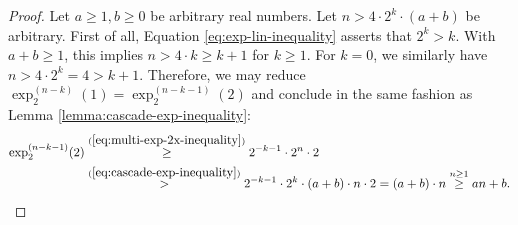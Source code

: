 \begin{proof}
	Let $a\geq 1,b\geq 0$ be arbitrary real numbers.
	Let $n>4\cdot 2^k \cdot (a+b)$ be arbitrary. 
	First of all, Equation \ref{eq:exp-lin-inequality} asserts that $2^k>k$.
	With $a+b\geq 1$, this implies $n>4\cdot k\geq k+1$ for $k\geq 1$.
	For $k=0$, we similarly have $n>4\cdot 2^k=4>k+1$.
	Therefore, we may reduce $\exp^{(n-k)}_2(1)=\exp^{(n-k-1)}_2(2)$ and conclude in the same fashion as Lemma \ref{lemma:cascade-exp-inequality}:
	\begin{align}
		\exp^{(n-k-1)}_2(2) &\overset{(\ref{eq:multi-exp-2x-inequality})}{\geq} 2^{-k-1}\cdot 2^n \cdot 2\\
		&\overset{(\ref{eq:cascade-exp-inequality})}{>} 2^{-k-1} \cdot 2^k\cdot (a+b)\cdot n \cdot 2 = (a+b)\cdot n \overset{n\geq 1}{\geq} an+b.
	\end{align}
\end{proof}
